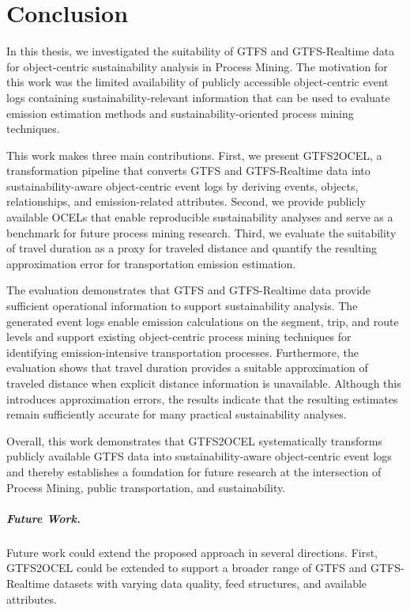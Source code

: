 \chapter{Conclusion}
\label{chap:conclusion}

In this thesis, we investigated the suitability of GTFS and GTFS-Realtime data for object-centric sustainability analysis in Process Mining. The motivation for this work was the limited availability of publicly accessible object-centric event logs containing sustainability-relevant information that can be used to evaluate emission estimation methods and sustainability-oriented process mining techniques.

This work makes three main contributions. First, we present GTFS2OCEL, a transformation pipeline that converts GTFS and GTFS-Realtime data into sustainability-aware object-centric event logs by deriving events, objects, relationships, and emission-related attributes. Second, we provide publicly available OCELs that enable reproducible sustainability analyses and serve as a benchmark for future process mining research. Third, we evaluate the suitability of travel duration as a proxy for traveled distance and quantify the resulting approximation error for transportation emission estimation.

The evaluation demonstrates that GTFS and GTFS-Realtime data provide sufficient operational information to support sustainability analysis. The generated event logs enable emission calculations on the segment, trip, and route levels and support existing object-centric process mining techniques for identifying emission-intensive transportation processes. Furthermore, the evaluation shows that travel duration provides a suitable approximation of traveled distance when explicit distance information is unavailable. Although this introduces approximation errors, the results indicate that the resulting estimates remain sufficiently accurate for many practical sustainability analyses.

Overall, this work demonstrates that GTFS2OCEL systematically transforms publicly available GTFS data into sustainability-aware object-centric event logs and thereby establishes a foundation for future research at the intersection of Process Mining, public transportation, and sustainability.

\paragraph{Future Work.}
Future work could extend the proposed approach in several directions. First, GTFS2OCEL could be extended to support a broader range of GTFS and GTFS-Realtime datasets with varying data quality, feed structures, and available attributes.

